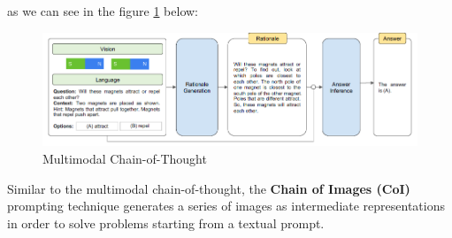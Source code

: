 as we can see in the figure \ref{fig:16} below:
\begin{figure}[H]
    \centering
    \includegraphics[width=0.9\linewidth]{Figures/fig_16.png}
    \caption{Multimodal Chain-of-Thought}
    \label{fig:16}
\end{figure}
Similar to the multimodal chain-of-thought, the \textbf{Chain of Images (CoI)} prompting technique \cite{meng2023chain} generates a series of images as intermediate representations in order to solve problems starting from a textual prompt.
